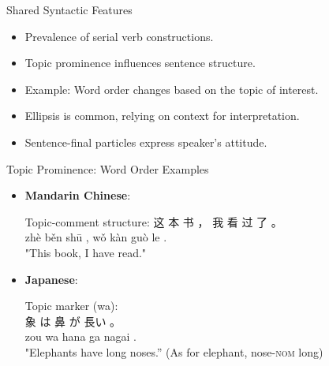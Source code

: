 \documentclass{beamer}
\begin{document}
\begin{frame}{Shared Syntactic Features}
    \begin{itemize}
        \item Prevalence of serial verb constructions.
        \item Topic prominence influences sentence structure.
        \item Example: Word order changes based on the topic of interest.
        \item Ellipsis is common, relying on context for interpretation.
        \item Sentence-final particles express speaker's attitude.
    \end{itemize}
\end{frame}
\begin{frame}{Topic Prominence: Word Order Examples}
    \begin{itemize}
        \item \textbf{Mandarin Chinese}:
            \begin{exe}
                \ex Topic-comment structure: 
                \gll 这 本 书 ， 我 看 过 了 。 \\
                 zhè běn shū , wǒ kàn guò le . \\
                \glt "This book, I have read."
            \end{exe}
        \item \textbf{Japanese}:
          \begin{exe}
            \ex Topic marker  (wa): \\
            \gll 象 は 鼻 が 長い 。 \\
            zou  wa hana ga nagai . \\
            \glt "Elephants have long noses.''
            \glt (As for elephant, nose-\textsc{nom} long)
          \end{exe}
    \end{itemize}
\end{frame}
\end{document}

